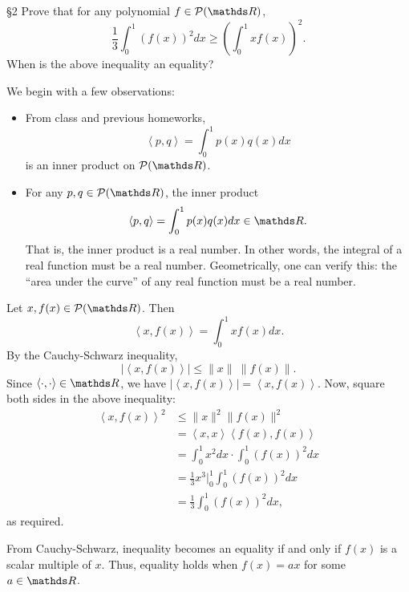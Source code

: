 \documentclass{homework}
\begin{document}
\begin{problem}{\S 2}
  Prove that for any polynomial $f\in \mc{P}(\R)$, \[
    \frac{1}{3}\int_0^1(f(x))^2dx\ge \left( \int_0^1xf(x) \right) ^2
  .\] When is the above inequality an equality?
\end{problem}
\begin{solution}
  We begin with a few observations:
  \begin{itemize}
    \item From class and previous homeworks, \[
        \left<p,q \right> =\int_0^1p(x)q(x)dx
      \] is an inner product on $\mc{P}(\R)$.
    \item For any $p,q\in \mc{P}(\R)$, the inner product \[
        \left<p,q \right> =\int_0^1 p(x)q(x)dx\in \R
    .\] That is, the inner product is a real number. In other words, the integral of a real function
    must be a real number. Geometrically, one can verify this: the ``area under the curve'' of any
    real function must be a real number.
  \end{itemize}

  Let $x,f(x)\in \mc{P}(\R)$. Then \[
    \left<x,f(x) \right> =\int_0^1 xf(x)dx
  .\] By the Cauchy-Schwarz inequality, \[
    \left| \left<x,f(x) \right>  \right|\le \|x\|~\|f(x)\|
  .\] Since $\left<\cdot ,\cdot  \right> \in \R$, we have $\left| \left<x,f(x) \right>  \right|
  =\left<x,f(x) \right> $. Now, square both sides in the above inequality:
  \begin{align*}
    \left<x,f(x) \right> ^2&\le \|x\|^2\|f(x)\|^2\\
                           &= \left<x,x \right> \left<f(x),f(x) \right>  \\
                           &= \int_0^1x^2dx\cdot \int_0^1(f(x))^2dx \\
                           &= \frac{1}{3}x^3|_0^1\int_0^1(f(x))^2dx \\
                           &=\frac{1}{3}\int_0^1(f(x))^2dx
  ,\end{align*} as required.

  From Cauchy-Schwarz, inequality becomes an equality if and only if $f(x)$ is a scalar multiple of
  $x$. Thus, equality holds when $f(x)=ax$ for some $a\in \R$.
\end{solution}
\end{document}
